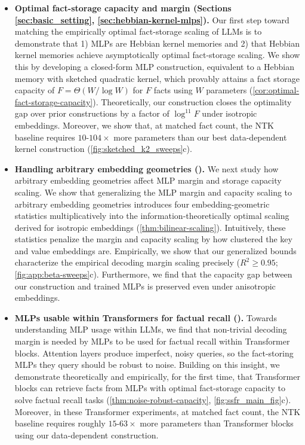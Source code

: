 \begin{itemize}[leftmargin=1em, itemsep=0.5em]
\item \textbf{Optimal fact-storage capacity and margin (Sections \ref{sec:basic_setting}, \ref{sec:hebbian-kernel-mlps}).}
Our first step toward matching the empirically optimal fact-storage scaling of LLMs is to demonstrate that 1) MLPs are Hebbian kernel memories and 2) that Hebbian kernel memories achieve asymptotically optimal fact-storage scaling. We show this by developing a closed-form MLP construction, equivalent to a Hebbian memory with sketched quadratic kernel, which provably attains a fact storage capacity of $F = \Theta(W / \log W)$ for $F$ facts using $W$ parameters (\cref{cor:optimal-fact-storage-capacity}).
Theoretically, our construction closes the optimality gap over prior constructions by a factor of $\log^{11} F$ under isotropic embeddings.
Moreover, we show that, at matched fact count, the NTK baseline requires $10$-$104\times$ more parameters than our best data-dependent kernel construction (\cref{fig:sketched_k2_sweeps}c).

\item \textbf{Handling arbitrary embedding geometries ().}
We next study how arbitrary embedding geometries affect MLP margin and storage capacity scaling. We show that generalizing the MLP margin and capacity scaling to arbitrary embedding geometries introduces four embedding-geometric statistics multiplicatively into the information-theoretically optimal scaling derived for isotropic embeddings (\cref{thm:bilinear-scaling}). Intuitively, these statistics penalize the margin and capacity scaling by how clustered the key and value embeddings are. Empirically, we show that our generalized bounds characterize the empirical decoding margin scaling precisely ($R^2 \geq 0.95$; \cref{fig:app:beta-sweeps}c). Furthermore, we find that the capacity gap between our construction and trained MLPs is preserved even under anisotropic embeddings.


\item \textbf{MLPs usable within Transformers for factual recall ().}
Towards understanding MLP usage within LLMs, we find that non-trivial decoding margin is needed by MLPs to be used for factual recall within Transformer blocks. Attention layers produce imperfect, noisy queries, so the fact-storing MLPs they query should be robust to noise. Building on this insight, we demonstrate theoretically and empirically, for the first time, that Transformer blocks can retrieve facts from MLPs with optimal fact-storage capacity to solve factual recall tasks (\cref{thm:noise-robust-capacity}, \cref{fig:ssfr_main_fig}c). Moreover, in these Transformer experiments, at matched fact count, the NTK baseline requires roughly $15$-$63\times$ more parameters than Transformer blocks using our data-dependent construction.
\end{itemize}

